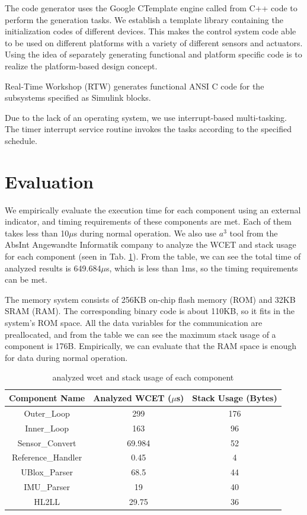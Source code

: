 \documentclass[10pt, conference, compsocconf]{IEEEtran}
\begin{document}
The code generator uses the Google CTemplate engine called from C++ code to perform the generation tasks. We establish a template library containing the initialization codes of different devices. This makes the control system code able to be used on different platforms with a variety of different sensors and actuators. Using the idea of separately generating functional and platform specific code is to realize the platform-based design concept.

Real-Time Workshop (RTW) generates functional ANSI C code for the subsystems specified as Simulink blocks.

Due to the lack of an operating system, we use interrupt-based multi-tasking. The timer interrupt service routine invokes the tasks according to the specified schedule.


\section{Evaluation}

We empirically evaluate the execution time for each component using an external indicator, and timing requirements of these components are met. Each of them takes less than 10$\mu$s during normal operation. We also use $a^3$ tool from the AbsInt Angewandte Informatik company to analyze the WCET and stack usage for each component (seen in Tab. \ref{table:TimingStackAnalyses}). From the table, we can see the total time of analyzed results is 649.684$\mu$s, which is less than 1ms, so the timing requirements can be met.

The memory system consists of 256KB on-chip flash memory (ROM) and 32KB SRAM (RAM). The corresponding binary code is about 110KB, so it fits in the system's ROM space. All the data variables for the communication are preallocated, and from the table we can see the maximum stack usage of a component is 176B. Empirically, we can evaluate that the RAM space is enough for data during normal operation.

\begin{table}
\caption{analyzed wcet and stack usage of each component}
\centering
\begin{tabular}{c c c}
\hline\hline
Component Name & Analyzed WCET ($\mu$s) & Stack Usage (Bytes) \\ [0.5ex]
\hline
Outer\_Loop & 299 & 176 \\
Inner\_Loop & 163 & 96 \\
Sensor\_Convert & 69.984 & 52 \\
Reference\_Handler & 0.45 & 4 \\
UBlox\_Parser & 68.5 & 44 \\ 
IMU\_Parser & 19 & 40 \\
HL2LL & 29.75 & 36 \\
[0.5ex]
\hline
\end{tabular}
\label{table:TimingStackAnalyses}
\end{table}
\end{document}
